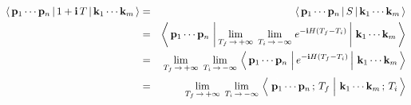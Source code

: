 
\begin{eqnarray*}
\left\langle\,
    \mathbf{p}_{1} \cdots \mathbf{p}_{n}
    \,\vert\,
    1+\i\,T
    \,\vert\,
    \mathbf{k}_{1} \cdots \mathbf{k}_{m}
    \,\right\rangle
& = &
    \left\langle\,
        \mathbf{p}_{1} \cdots \mathbf{p}_{n}
        \,\vert\,
        S
        \,\vert\,
        \mathbf{k}_{1} \cdots \mathbf{k}_{m}
        \,\right\rangle
\\
& = &
    \left\langle\,
        \mathbf{p}_{1} \cdots \mathbf{p}_{n}
        \,\left\vert\,
        \underset{T_{f}\,\rightarrow\,+\infty}{\lim}\;\,
        \underset{T_{i}\,\rightarrow\,-\infty}{\lim}\;
        e^{-\i H(T_{f}-T_{i})}
        \,\right\vert\,
        \mathbf{k}_{1} \cdots \mathbf{k}_{m}
        \,\right\rangle
\\
& = &
    \underset{T_{f}\,\rightarrow\,+\infty}{\lim}\;\,
    \underset{T_{i}\,\rightarrow\,-\infty}{\lim}\,
    \left\langle\,
        \mathbf{p}_{1} \cdots \mathbf{p}_{n}
        \,\left\vert\,
        e^{-\i H(T_{f}-T_{i})}
        \,\right\vert\,
        \mathbf{k}_{1} \cdots \mathbf{k}_{m}
        \,\right\rangle
\\
& = &
    \underset{T_{f}\,\rightarrow\,+\infty}{\lim}\;\,
    \underset{T_{i}\,\rightarrow\,-\infty}{\lim}\,
    \left\langle\,
        \left.
        \overset{{\color{white}1}}{\mathbf{p}_{1}} \cdots \mathbf{p}_{n}\,;\,T_{f}
        \;\right\vert\,
        \mathbf{k}_{1} \cdots \mathbf{k}_{m}\,;\,T_{i}
        \,\right\rangle
\end{eqnarray*}

